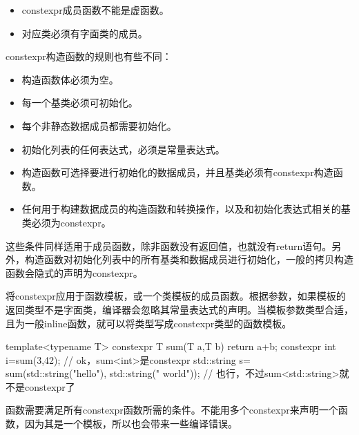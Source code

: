 \begin{itemize}
\item constexpr成员函数不能是虚函数。
\item 对应类必须有字面类的成员。
\end{itemize}

constexpr构造函数的规则也有些不同：

\begin{itemize}
\item 构造函数体必须为空。
\item 每一个基类必须可初始化。
\item 每个非静态数据成员都需要初始化。
\item 初始化列表的任何表达式，必须是常量表达式。
\item 构造函数可选择要进行初始化的数据成员，并且基类必须有constexpr构造函数。
\item 任何用于构建数据成员的构造函数和转换操作，以及和初始化表达式相关的基类必须为constexpr。
\end{itemize}

这些条件同样适用于成员函数，除非函数没有返回值，也就没有return语句。另外，构造函数对初始化列表中的所有基类和数据成员进行初始化，一般的拷贝构造函数会隐式的声明为constexpr。


将constexpr应用于函数模板，或一个类模板的成员函数。根据参数，如果模板的返回类型不是字面类，编译器会忽略其常量表达式的声明。当模板参数类型合适，且为一般inline函数，就可以将类型写成constexpr类型的函数模板。

\begin{cpp}
template<typename T>
constexpr T sum(T a,T b)
{
  return a+b;
}
constexpr int i=sum(3,42);  // ok，sum<int>是constexpr
std::string s=
  sum(std::string("hello"),
      std::string(" world"));  // 也行，不过sum<std::string>就不是constexpr了
\end{cpp}

函数需要满足所有constexpr函数所需的条件。不能用多个constexpr来声明一个函数，因为其是一个模板，所以也会带来一些编译错误。


